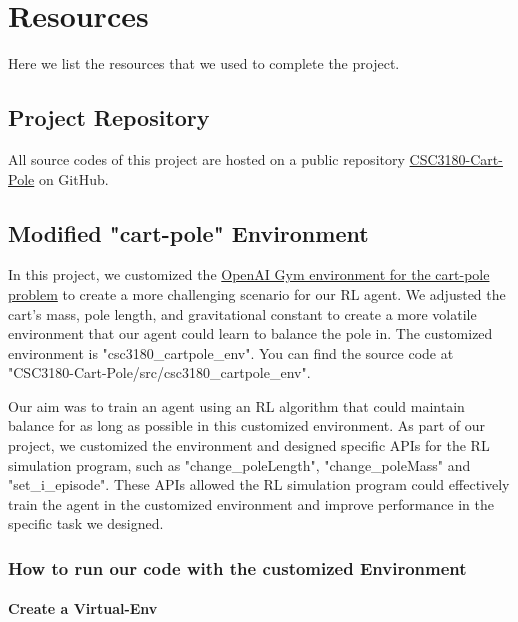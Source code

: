 \documentclass[10pt,a4paper]{article}
\begin{document}
	
	
	\section{Resources}
	Here we list  the resources that we used to complete the project. 
	
	\subsection{Project Repository}
	All source codes of this project are hosted on a public repository \href{https://github.com/zixingjiang/CSC3180-Cart-Pole}{CSC3180-Cart-Pole} on GitHub. 
	
	
	\subsection{Modified "cart-pole" Environment}\label{5.2}
	In this project, we customized the \href{https://gymnasium.farama.org/environments/classic_control/cart_pole/}{OpenAI Gym environment for the cart-pole problem} to create a more challenging scenario for our RL agent. We adjusted the cart's mass, pole length, and gravitational constant to create a more volatile environment that our agent could learn to balance the pole in. The customized environment is "csc3180\_cartpole\_env". You can find the source code at "CSC3180-Cart-Pole/src/csc3180\_cartpole\_env".
	
	Our aim was to train an agent using an RL algorithm that could maintain balance for as long as possible in this customized environment. As part of our project, we customized the environment and designed specific APIs for the RL simulation program, such as "change\_poleLength", "change\_poleMass" and "set\_i\_episode". These APIs allowed the RL simulation program could effectively train the agent in the customized environment and improve performance in the specific task we designed. 
	
	\subsubsection{How to run our code with the customized Environment}
	\paragraph{Create a Virtual-Env}
	
\end{document}
